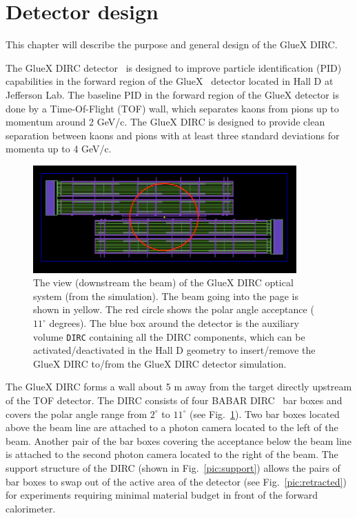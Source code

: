 \section{Detector design}

This chapter will describe the purpose and general design of the GlueX DIRC.
\vspace{0.5cm}

The GlueX DIRC detector~\cite{dirc} is designed to improve particle identification (PID) capabilities in the forward region of the GlueX~\cite{gluex1, gluex2} detector located in Hall D at Jefferson Lab. The baseline PID in the forward region of the GlueX detector is done by a Time-Of-Flight (TOF) wall, which separates kaons from pions up to momentum around 2 GeV/c. The GlueX DIRC is designed to provide clean separation between kaons and pions with at least three standard deviations for momenta up to 4 GeV/c.

\begin{figure}[!htb]
\centering
\includegraphics[width=0.9\textwidth]{pics/sim1.png}
\caption{\label{pic:sim}
The view (downstream the beam) of the GlueX DIRC optical system (from the simulation). The beam going into the page is shown in yellow. The red circle shows the polar angle acceptance ($11^{\circ}$ degrees).
The blue box around the detector is the auxiliary volume \texttt{DIRC} containing all the DIRC components, which can be activated/deactivated in the Hall D geometry to insert/remove the GlueX DIRC to/from the GlueX DIRC detector simulation.}
\end{figure}

The GlueX DIRC forms a wall about 5 m away from the target directly upstream of the TOF detector. The DIRC consists of four BABAR DIRC~\cite{bdirc1} bar boxes and covers the polar angle range from $2^{\circ}$ to $11^{\circ}$ (see Fig.~\ref{pic:sim}). Two bar boxes located above the beam line are attached to a photon camera located to the left of the beam. Another pair of the bar boxes covering the acceptance below the beam line is attached to the second photon camera located to the right of the beam. The support structure of the DIRC (shown in Fig.~\ref{pic:support}) allows the pairs of bar boxes to swap out of the active area of the detector (see Fig.~\ref{pic:retracted}) for experiments requiring minimal material budget in front of the forward calorimeter.

